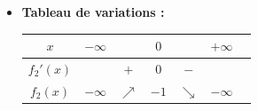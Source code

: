 \documentclass[11pt,a4paper]{article}
\begin{document}
\begin{correctionbox}[Exercice 3]
\begin{itemize}
\begin{itemize}
        Comme $\lim_{x \to +\infty} e^x = +\infty$, par produit : $\lim_{x \to +\infty} f_2(x) = -\infty$.
    \end{itemize}
    \item \textbf{Tableau de variations :}
    \begin{center}
    \begin{tabular}{|c|lccccr|}
    \hline
    $x$ & $-\infty$ & & $0$ & & $+\infty$ \\
    \hline
    $f_2'(x)$ & & $+$ & $0$ & $-$ & \\
    \hline
    $f_2(x)$ & $-\infty$ & $\nearrow$ & $-1$ & $\searrow$ & $-\infty$ \\
    \hline
    \end{tabular}
    \end{center}
\end{itemize}


\end{correctionbox}
\end{document}
